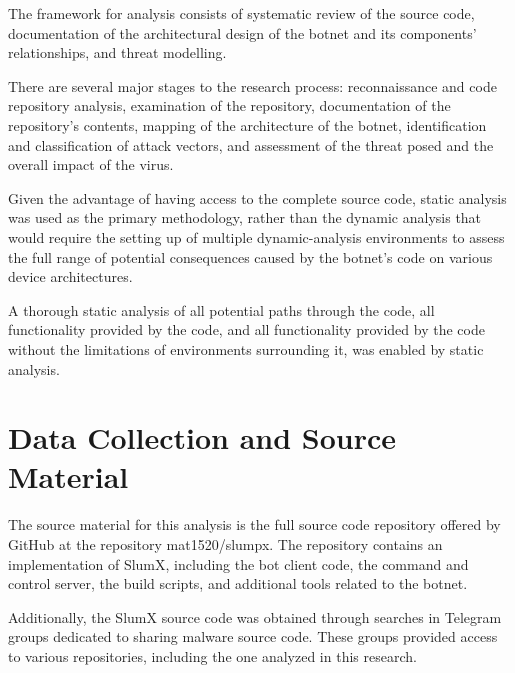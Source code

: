 \documentclass[12pt,letterpaper]{report}
\begin{document}
The framework for analysis consists of systematic review of the source code, documentation of the architectural design of the botnet and its components' relationships, and threat modelling.

There are several major stages to the research process: reconnaissance and code repository analysis, examination of the repository, documentation of the repository's contents, mapping of the architecture of the botnet, identification and classification of attack vectors, and assessment of the threat posed and the overall impact of the virus.

Given the advantage of having access to the complete source code, static analysis was used as the primary methodology, rather than the dynamic analysis that would require the setting up of multiple dynamic-analysis environments to assess the full range of potential consequences caused by the botnet's code on various device architectures.

A thorough static analysis of all potential paths through the code, all functionality provided by the code, and all functionality provided by the code without the limitations of environments surrounding it, was enabled by static analysis.

\section{Data Collection and Source Material}


The source material for this analysis is the full source code repository offered by GitHub at the repository mat1520/slumpx. The repository contains an implementation of SlumX, including the bot client code, the command and control server, the build scripts, and additional tools related to the botnet.

Additionally, the SlumX source code was obtained through searches in Telegram groups dedicated to sharing malware source code. These groups provided access to various repositories, including the one analyzed in this research.
\end{document}
